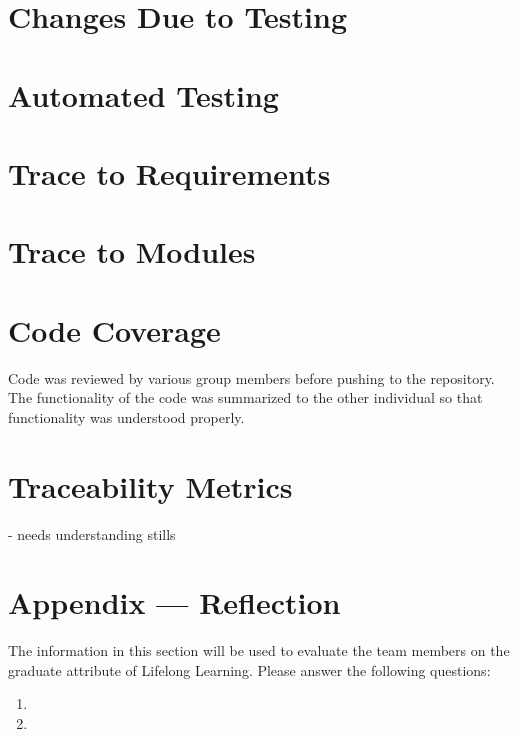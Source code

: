 \documentclass[12pt, titlepage]{article}
\begin{document}
\section{Changes Due to Testing}

\section{Automated Testing}
		
\section{Trace to Requirements}
		
\section{Trace to Modules}		


\section{Code Coverage}

Code was reviewed by various group members before pushing to the repository. The functionality of the code was summarized to the other individual so that functionality was understood properly.

\section{Traceability Metrics} 

- needs understanding stills




\newpage{}
\section*{Appendix --- Reflection}

The information in this section will be used to evaluate the team members on the
graduate attribute of Lifelong Learning.  Please answer the following questions:

\begin{enumerate}
  \item 
  \item 
\end{enumerate}
\end{document}

